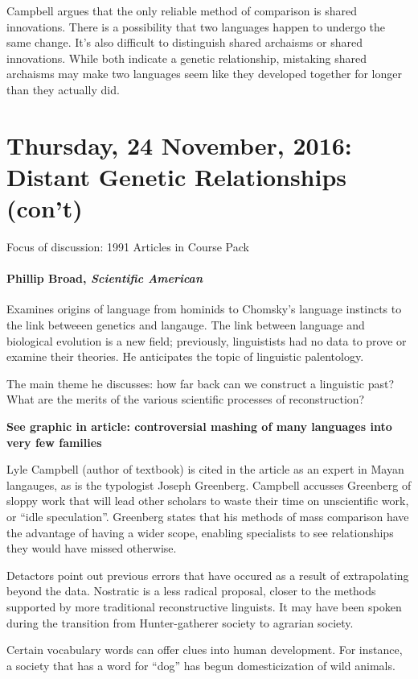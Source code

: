\documentclass{exam}
\begin{document}
Campbell argues that the only reliable method of comparison is shared innovations.
There is a possibility that two languages happen to undergo the same change.
It's also difficult to distinguish shared archaisms or shared innovations. 
While both indicate a genetic relationship, mistaking shared archaisms may make two languages seem like they developed together for longer than they actually did.



\section*{Thursday, 24 November, 2016: Distant Genetic Relationships (con't)}

Focus of discussion: 1991 Articles in Course Pack

\paragraph{Phillip Broad, \textit{Scientific American}}
Examines origins of language from hominids to Chomsky's language instincts to the link betweeen genetics and langauge. 
The link between language and biological evolution is a new field; previously, linguistists had no data to prove or examine their theories. 
He anticipates the topic of linguistic palentology. 

The main theme he discusses: how far back can we construct a linguistic past?
What are the merits of the various scientific processes of reconstruction?


\textbf{See graphic in article: controversial mashing of many languages into very few families}

Lyle Campbell (author of textbook) is cited in the article as an expert in Mayan langauges, as is the typologist Joseph Greenberg.
Campbell accusses Greenberg of sloppy work that will lead other scholars to waste their time on unscientific work, or ``idle speculation''.
Greenberg states that his methods of mass comparison have the advantage of having a wider scope, enabling specialists to see relationships they would have missed otherwise.

Detactors point out previous errors that have occured as a result of extrapolating beyond the data.
Nostratic is a less radical proposal, closer to the methods supported by more traditional reconstructive linguists. 
It may have been spoken during the transition from Hunter-gatherer society to agrarian society. 

Certain vocabulary words can offer clues into human development. 
For instance, a society that has a word for ``dog'' has begun domesticization of wild animals. 
\end{document}

